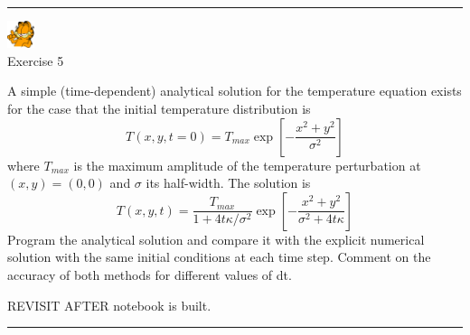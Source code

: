 \begin{center}
\begin{minipage}[t]{0.77\textwidth}
\par\noindent\rule{\textwidth}{0.4pt}
\begin{center}
\includegraphics[width=0.8cm]{images/garftr} \\
{\color{orange}Exercise 5}
\end{center}


A simple (time-dependent) analytical solution for the temperature equation exists for 
the case that the initial temperature distribution is
\begin{equation}
T(x,y,t=0) = T_{max} \exp \left[ -\frac{x^2+y^2}{\sigma^2}   \right]
\end{equation}
where $T_{max}$ is the maximum amplitude of the temperature perturbation 
at $(x,y) = (0, 0)$ and $\sigma$ its half-width. The solution is
\begin{equation}
T(x,y,t)=\frac{T_{max}}{1+4t\kappa/\sigma^2 } \exp \left[ -\frac{x^2+y^2}{\sigma^2 + 4t\kappa}   \right]
\end{equation}
Program the analytical solution and compare it with the explicit 
numerical solution with the same initial conditions at each time step. 
Comment on the accuracy of both methods for different values of dt.

REVISIT AFTER notebook is built.

\par\noindent\rule{\textwidth}{0.4pt}
\end{minipage}
\end{center}



